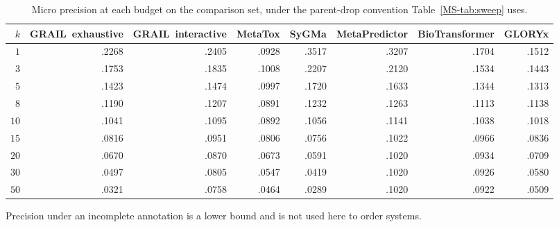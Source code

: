 \begin{table}[h]
\centering\scriptsize
\begin{threeparttable}
\caption{Micro precision at each budget on the comparison set, under the parent-drop convention Table~\ref{MS-tab:sweep} uses.}
\label{tab:si-precision}
\setlength{\tabcolsep}{4pt}
\begin{tabular}{rrrrrrrr}
\toprule
$k$ & GRAIL\ exhaustive & GRAIL\ interactive & MetaTox & SyGMa & MetaPredictor & BioTransformer & GLORYx \\
\midrule
$1$ & .2268 & .2405 & .0928 & .3517 & .3207 & .1704 & .1512 \\
$3$ & .1753 & .1835 & .1008 & .2207 & .2120 & .1534 & .1443 \\
$5$ & .1423 & .1474 & .0997 & .1720 & .1633 & .1344 & .1313 \\
$8$ & .1190 & .1207 & .0891 & .1232 & .1263 & .1113 & .1138 \\
$10$ & .1041 & .1095 & .0892 & .1056 & .1141 & .1038 & .1018 \\
$15$ & .0816 & .0951 & .0806 & .0756 & .1022 & .0966 & .0836 \\
$20$ & .0670 & .0870 & .0673 & .0591 & .1020 & .0934 & .0709 \\
$30$ & .0497 & .0805 & .0547 & .0419 & .1020 & .0926 & .0580 \\
$50$ & .0321 & .0758 & .0464 & .0289 & .1020 & .0922 & .0509 \\
\bottomrule
\end{tabular}
\begin{tablenotes}[flushleft]\footnotesize
\item Precision under an incomplete annotation is a lower bound and is not used here to order systems.
\end{tablenotes}
\end{threeparttable}
\end{table}
